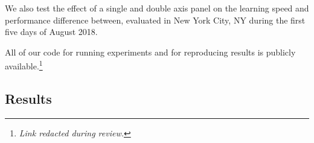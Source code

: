 \documentclass{article}
\begin{document}
{We also test the effect of a single and double axis panel on the learning speed and performance difference between, evaluated in New York City, NY during the first five days of August 2018.


All of our code for running experiments and for reproducing results is publicly available.\footnote{{\it Link redacted during review.}} %

\subsection{Results}


%


}
\end{document}
